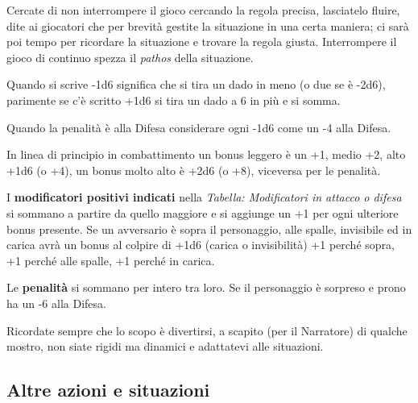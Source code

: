 \begin{multicols}{2}

\begin{changemargin}{0.3cm}{0.3cm}\begin{narratore}
Cercate di non interrompere il gioco cercando la regola precisa, lasciatelo fluire, dite ai giocatori che per brevità gestite la situazione in una certa maniera; ci sarà poi tempo per ricordare la situazione e trovare la regola giusta. Interrompere il gioco di continuo spezza il \emph{pathos} della situazione.
\end{narratore}\end{changemargin}

Quando si scrive -1d6 significa che si tira un dado in meno (o due se è -2d6), parimente se c'è scritto +1d6 si tira un dado a 6 in più e si somma.

Quando la penalità è alla Difesa considerare ogni -1d6 come un -4 alla Difesa.

\medskip

In linea di principio in combattimento un bonus leggero è un +1, medio +2, alto +1d6 (o +4), un bonus molto alto è +2d6 (o +8), viceversa per le penalità.

\medskip

I \textbf{modificatori positivi indicati} nella \emph{Tabella: Modificatori in attacco o difesa} si sommano a partire da quello maggiore e si aggiunge un +1 per ogni ulteriore bonus presente. Se un avversario è sopra il personaggio, alle spalle, invisibile ed in carica avrà un bonus al colpire di +1d6 (carica o invisibilità) +1 perché sopra, +1 perché alle spalle, +1 perché in carica.

Le \textbf{penalità} si sommano per intero tra loro. Se il personaggio è sorpreso e prono ha un -6 alla Difesa.

\begin{changemargin}{0.3cm}{0.3cm}\begin{narratore}
Ricordate sempre che lo scopo è divertirsi, a scapito (per il Narratore) di qualche mostro, non siate rigidi ma dinamici e adattatevi alle situazioni.
\end{narratore}\end{changemargin}

\subsection{Altre azioni e situazioni} \label{AltreAzioni}


\end{multicols}
